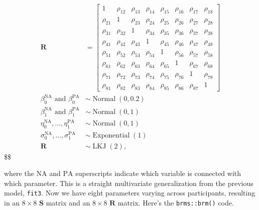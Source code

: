 \documentclass[]{article}
\begin{document}
\begin{align*}
\mathbf R & = \begin{bmatrix} 
1 & \rho_{12} & \rho_{13} & \rho_{14} & \rho_{15} & \rho_{16} & \rho_{17} & \rho_{18} \\ 
\rho_{21} & 1 & \rho_{23} & \rho_{24} & \rho_{25} & \rho_{26} & \rho_{27} & \rho_{28} \\ 
\rho_{31} & \rho_{32} & 1 & \rho_{34} & \rho_{35} & \rho_{36} & \rho_{37} & \rho_{38} \\ 
\rho_{41} & \rho_{42} & \rho_{43} & 1 & \rho_{45} & \rho_{46} & \rho_{47} & \rho_{48} \\ 
\rho_{51} & \rho_{52} & \rho_{53} & \rho_{54} & 1 & \rho_{56} & \rho_{57} & \rho_{58} \\ 
\rho_{61} & \rho_{62} & \rho_{63} & \rho_{64} & \rho_{65} & 1 & \rho_{67} & \rho_{68} \\ 
\rho_{71} & \rho_{72} & \rho_{73} & \rho_{74} & \rho_{75} & \rho_{76} & 1 & \rho_{78} \\ 
\rho_{81} & \rho_{82} & \rho_{83} & \rho_{84} & \rho_{85} & \rho_{86} & \rho_{87} & 1
\end{bmatrix} \\

\beta_0^\text{NA} \text{ and } \beta_0^\text{PA} & \sim \operatorname{Normal}(0, 0.2) \\
\beta_1^\text{NA} \text{ and } \beta_1^\text{PA} & \sim \operatorname{Normal}(0, 1) \\
\eta_0^\text{NA},..., \eta_1^\text{PA} & \sim \operatorname{Normal}(0, 1) \\
\sigma_0^\text{NA},..., \sigma_1^\text{PA} & \sim \operatorname{Exponential}(1) \\
\mathbf R & \sim \operatorname{LKJ}(2),
\end{align*} \$\$

where the \(\text{NA}\) and \(\text{PA}\) superscripts indicate which
variable is connected with which parameter. This is a straight
multivariate generalization from the previous model, \texttt{fit3}. Now
we have eight parameters varying across participants, resulting in an
\(8 \times 8\) \(\mathbf S\) matrix and an \(8 \times 8\) \(\mathbf R\)
matrix. Here's the \texttt{brms::brm()} code.
\end{document}
